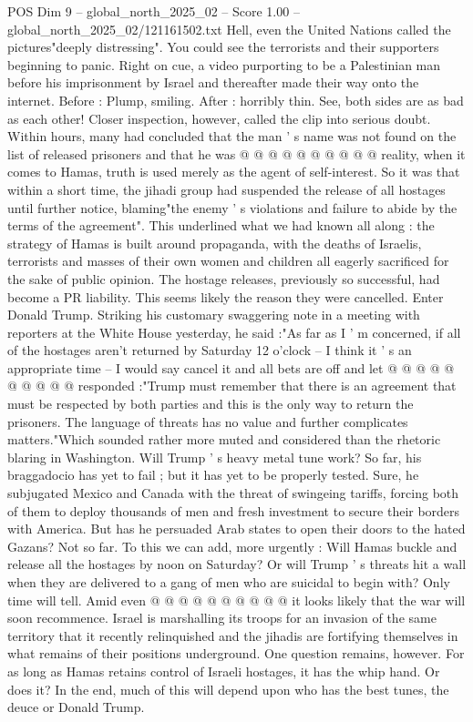 \begin{textsample}{POS Dim 9 – global\_north\_2025\_02 – Score 1.00 – global\_north\_2025\_02/121161502.txt}
Hell, even the United Nations called the pictures"deeply distressing".
You could see the terrorists and their supporters beginning to panic.
Right on cue, a video purporting to be a Palestinian man before his imprisonment by Israel and thereafter made their way onto the internet.
Before : Plump, smiling.
After : horribly thin.
See, both sides are as bad as each other!
Closer inspection, however, called the clip into serious doubt.
Within hours, many had concluded that the man ' s name was not found on the list of released prisoners and that he was @ @ @ @ @ @ @ @ @ @ reality, when it comes to Hamas, truth is used merely as the agent of self-interest.
So it was that within a short time, the jihadi group had suspended the release of all hostages until further notice, blaming"the enemy ' s violations and failure to abide by the terms of the agreement".
This underlined what we had known all along : the strategy of Hamas is built around propaganda, with the deaths of Israelis, terrorists and masses of their own women and children all eagerly sacrificed for the sake of public opinion.
The hostage releases, previously so successful, had become a PR liability.
This seems likely the reason they were cancelled.
Enter Donald Trump.
Striking his customary swaggering note in a meeting with reporters at the White House yesterday, he said :"As far as I ' m concerned, if all of the hostages aren't returned by Saturday 12 o'clock -- I think it ' s an appropriate time -- I would say cancel it and all bets are off and let @ @ @ @ @ @ @ @ @ @ responded :"Trump must remember that there is an agreement that must be respected by both parties and this is the only way to return the prisoners.
The language of threats has no value and further complicates matters."Which sounded rather more muted and considered than the rhetoric blaring in Washington.
Will Trump ' s heavy metal tune work?
So far, his braggadocio has yet to fail ; but it has yet to be properly tested.
Sure, he subjugated Mexico and Canada with the threat of swingeing tariffs, forcing both of them to deploy thousands of men and fresh investment to secure their borders with America.
But has he persuaded Arab states to open their doors to the hated Gazans?
Not so far.
To this we can add, more urgently : Will Hamas buckle and release all the hostages by noon on Saturday?
Or will Trump ' s threats hit a wall when they are delivered to a gang of men who are suicidal to begin with?
Only time will tell.
Amid even @ @ @ @ @ @ @ @ @ @ it looks likely that the war will soon recommence.
Israel is marshalling its troops for an invasion of the same territory that it recently relinquished and the jihadis are fortifying themselves in what remains of their positions underground.
One question remains, however.
For as long as Hamas retains control of Israeli hostages, it has the whip hand.
Or does it?
In the end, much of this will depend upon who has the best tunes, the deuce or Donald Trump.

\end{textsample}
